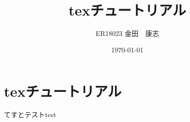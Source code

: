 \documentclass[10pt, a4j]{jsarticle}
\title{texチュートリアル}
\author{ER18023 金田　康志}
\date{\today}
\begin{document}
\maketitle
\section{texチュートリアル}
てすとテストtest
\end{document}
